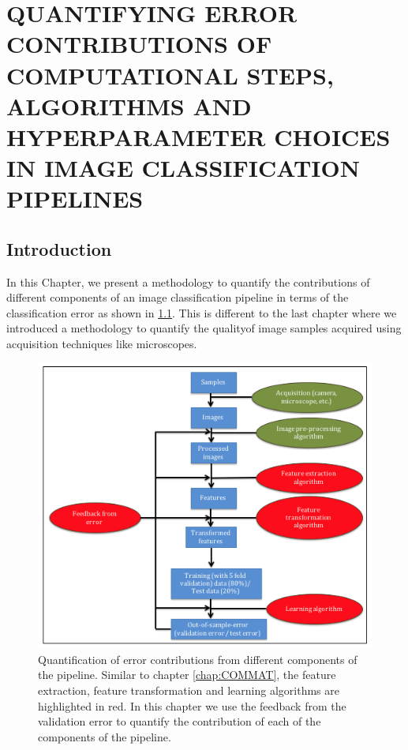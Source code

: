 \chapter{QUANTIFYING ERROR CONTRIBUTIONS OF COMPUTATIONAL STEPS, ALGORITHMS AND HYPERPARAMETER CHOICES IN IMAGE CLASSIFICATION PIPELINES}
\label{chap:EP}

\let\thefootnote\relax{}

\section{Introduction} 
\label{sec1}
In this Chapter, we present a methodology to quantify the contributions of different components of an image classification pipeline in terms of the classification error as shown in \ref{fig:chapter5}. This is different to the last chapter where we introduced a methodology to quantify the qualityof image samples acquired using acquisition techniques like microscopes. 

\begin{figure}[ht!]
\centering
\includegraphics[width=1.0\textwidth]{img/chapter5}
\caption{Quantification of error contributions from different components of the pipeline. Similar to  chapter \ref{chap:COMMAT}, the feature extraction, feature transformation and learning algorithms are highlighted in red. In this chapter we use the feedback from the validation error to quantify the contribution of each of the components of the pipeline.}
\label{fig:chapter5}
\end{figure}


